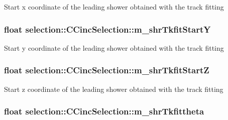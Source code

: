 Start x coordinate of the leading shower obtained with the track fitting \hypertarget{classselection_1_1CCincSelection_aeff05af138a16a516e5413e21b6bcdf1}{
\subsubsection[{m\-\_\-shr\-Tkfit\-Start\-Y}]{\setlength{\rightskip}{0pt plus 5cm}float selection\-::\-C\-Cinc\-Selection\-::m\-\_\-shr\-Tkfit\-Start\-Y\hspace{0.3cm}{\ttfamily [private]}}}\label{classselection_1_1CCincSelection_aeff05af138a16a516e5413e21b6bcdf1}
Start y coordinate of the leading shower obtained with the track fitting \hypertarget{classselection_1_1CCincSelection_a9c1c8138a2febe952478d15845ca8846}{
\subsubsection[{m\-\_\-shr\-Tkfit\-Start\-Z}]{\setlength{\rightskip}{0pt plus 5cm}float selection\-::\-C\-Cinc\-Selection\-::m\-\_\-shr\-Tkfit\-Start\-Z\hspace{0.3cm}{\ttfamily [private]}}}\label{classselection_1_1CCincSelection_a9c1c8138a2febe952478d15845ca8846}
Start z coordinate of the leading shower obtained with the track fitting \hypertarget{classselection_1_1CCincSelection_a9fa1d825a900a4081323091daa9b0aa7}{
\subsubsection[{m\-\_\-shr\-Tkfittheta}]{\setlength{\rightskip}{0pt plus 5cm}float selection\-::\-C\-Cinc\-Selection\-::m\-\_\-shr\-Tkfittheta\hspace{0.3cm}{\ttfamily [private]}}}\label{classselection_1_1CCincSelection_a9fa1d825a900a4081323091daa9b0aa7}
